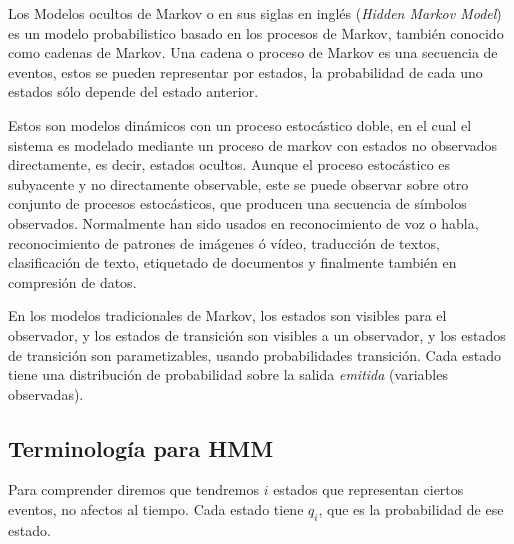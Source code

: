 


Los Modelos ocultos de Markov o en sus siglas en inglés \HMM (\emph{Hidden Markov Model})  es un modelo probabilistico basado en los procesos de Markov, también conocido como cadenas de Markov. Una cadena o proceso de Markov es una secuencia de eventos, estos se pueden representar por estados, la probabilidad de cada uno estados sólo depende del estado anterior.


Estos \HMM son modelos dinámicos con un proceso estocástico doble, en el cual el sistema es modelado mediante un proceso de markov con estados no observados directamente, es decir, estados ocultos. Aunque el proceso estocástico es subyacente y no directamente observable, este se puede observar sobre otro conjunto de procesos estocásticos, que producen una secuencia de símbolos observados. Normalmente han sido usados en reconocimiento de voz o habla, reconocimiento de patrones de imágenes ó vídeo, traducción de textos, clasificación de texto, etiquetado de documentos y finalmente también en compresión de datos.

En los modelos tradicionales de Markov, los estados son visibles para el observador, y los estados de transición son visibles a un observador, y los estados de transición son parametizables, usando probabilidades transición. Cada estado tiene una distribución de probabilidad sobre la salida \emph{emitida} (variables observadas).




\subsection{Terminología para HMM}

Para comprender diremos que tendremos $i$ estados que representan ciertos eventos, no afectos al tiempo. Cada estado tiene $q_{i}$, que es la probabilidad de ese estado.

